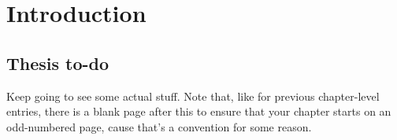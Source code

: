 \chapter[Introduction]{Introduction}%
\label{ch:introduction}

\section{Thesis to-do}

Keep going to see some actual stuff. Note that, like for previous chapter-level entries, there is a blank page after this to ensure that your chapter starts on an odd-numbered page, cause that's a convention for some reason.
